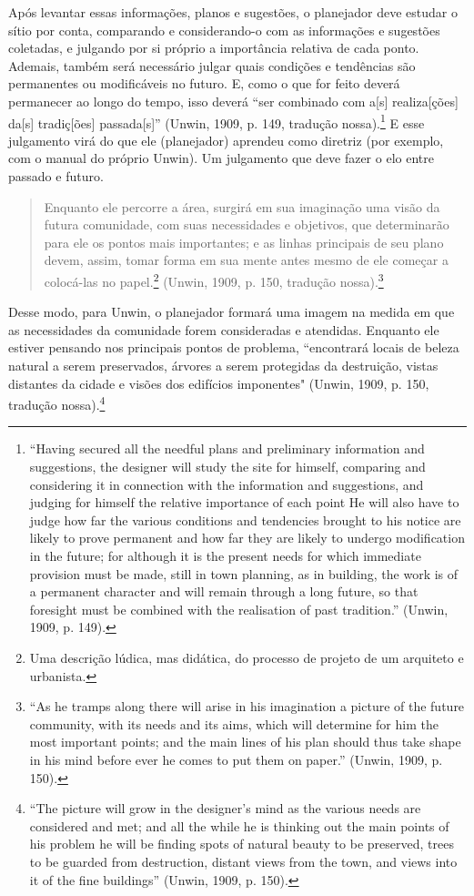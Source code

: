 \documentclass[12pt, a4paper]{book} %
\begin{document}
        Após levantar essas informações, planos e sugestões, o planejador deve estudar o sítio por conta, comparando e considerando-o com as informações e sugestões coletadas, e julgando por si próprio a importância relativa de cada ponto. Ademais, também será necessário julgar quais condições e tendências são permanentes ou modificáveis no futuro. E, como o que for feito deverá permanecer ao longo do tempo, isso deverá ``ser combinado com a[s] realiza[ções] da[s] tradiç[ões] passada[s]'' (Unwin, 1909, p. 149, tradução nossa).\footnote[43]{``Having secured all the needful plans and preliminary information and suggestions, the designer will study the site for himself, comparing and considering it in connection with the information and suggestions, and judging for himself the relative importance of each point He will also have to judge how far the various conditions and tendencies brought to his notice are likely to prove permanent and how far they are likely to undergo modification in the future; for although it is the present needs for which immediate provision must be made, still in town planning, as in building, the work is of a permanent character and will remain through a long future, so that foresight must be combined with the realisation of past tradition.'' (Unwin, 1909, p. 149).} E esse julgamento virá do que ele (planejador) aprendeu como diretriz (por exemplo, com o manual do próprio Unwin). Um julgamento que deve fazer o elo entre passado e futuro.

        \begin{quotation}
            Enquanto ele percorre a área, surgirá em sua imaginação uma visão da futura comunidade, com suas necessidades e objetivos, que determinarão para ele os pontos mais importantes; e as linhas principais de seu plano devem, assim, tomar forma em sua mente antes mesmo de ele começar a colocá-las no papel.\footnote[44]{Uma descrição lúdica, mas didática, do processo de projeto de um arquiteto e urbanista.} (Unwin, 1909, p. 150, tradução nossa).\footnote[45]{ ``As he tramps along there will arise in his imagination a picture of the future community, with its needs and its aims, which will determine for him the most important points; and the main lines of his plan should thus take shape in his mind before ever he comes to put them on paper.'' (Unwin, 1909, p. 150).}
        \end{quotation}

        Desse modo, para Unwin, o planejador formará uma imagem na medida em que as necessidades da comunidade forem consideradas e atendidas. Enquanto ele estiver pensando nos principais pontos de problema, ``encontrará locais de beleza natural a serem preservados, árvores a serem protegidas da destruição, vistas distantes da cidade e visões dos edifícios imponentes" (Unwin, 1909, p. 150, tradução nossa).\footnote[46]{``The picture will grow in the designer's mind as the various needs are considered and met; and all the while he is thinking out the main points of his problem he will be finding spots of natural beauty to be preserved, trees to be guarded from destruction, distant views from the town, and views into it of the fine buildings'' (Unwin, 1909, p. 150).}
\end{document}
